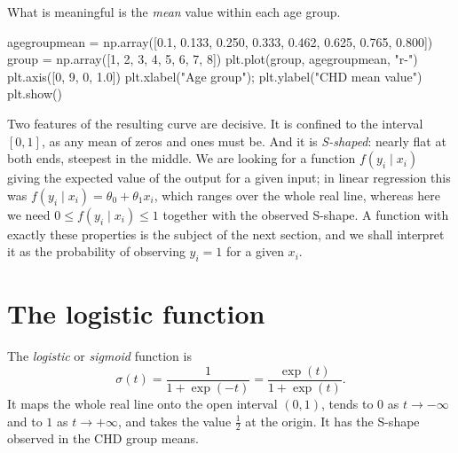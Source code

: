 What is meaningful is the \emph{mean} value within each age group.

\begin{Python}{}
agegroupmean = np.array([0.1, 0.133, 0.250, 0.333, 0.462, 0.625, 0.765, 0.800])
group = np.array([1, 2, 3, 4, 5, 6, 7, 8])
plt.plot(group, agegroupmean, "r-")
plt.axis([0, 9, 0, 1.0])
plt.xlabel("Age group"); plt.ylabel("CHD mean value")
plt.show()
\end{Python}

Two features of the resulting curve are decisive.  It is confined to the
interval $[0,1]$, as any mean of zeros and ones must be.  And it is
\emph{S-shaped}: nearly flat at both ends, steepest in the middle.  We are
looking for a function $f(y_i\mid x_i)$ giving the expected value of the
output for a given input; in linear regression this was
$f(y_i\mid x_i)=\theta_0+\theta_1x_i$, which ranges over the whole real line,
whereas here we need $0\le f(y_i\mid x_i)\le1$ together with the observed
S-shape.  A function with exactly these properties is the subject of the next
section, and we shall interpret it as the probability of observing $y_i=1$ for
a given $x_i$.

\section{The logistic function}
\label{sec:sigmoid}

The \emph{logistic} or \emph{sigmoid} function is
\begin{equation}
  \sigma(t) = \frac{1}{1+\exp(-t)} = \frac{\exp(t)}{1+\exp(t)} .
  \label{eq:5-sigmoid}
\end{equation}
It maps the whole real line onto the open interval $(0,1)$, tends to $0$ as
$t\to-\infty$ and to $1$ as $t\to+\infty$, and takes the value $\tfrac12$ at
the origin.  It has the S-shape observed in the CHD group means.

